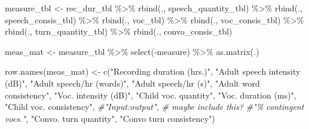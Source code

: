 \documentclass[
]{article}
\newenvironment{Shaded}{\begin{snugshade}}{\end{snugshade}}
\newcommand{\CommentTok}[1]{\textcolor[rgb]{0.56,0.35,0.01}{\textit{#1}}}
\newcommand{\FunctionTok}[1]{\textcolor[rgb]{0.00,0.00,0.00}{#1}}
\newcommand{\NormalTok}[1]{#1}
\newcommand{\OtherTok}[1]{\textcolor[rgb]{0.56,0.35,0.01}{#1}}
\newcommand{\SpecialCharTok}[1]{\textcolor[rgb]{0.00,0.00,0.00}{#1}}
\newcommand{\StringTok}[1]{\textcolor[rgb]{0.31,0.60,0.02}{#1}}
\begin{document}
\begin{Shaded}
\begin{Highlighting}[]
\NormalTok{measure\_tbl }\OtherTok{\textless{}{-}}\NormalTok{ rec\_dur\_tbl }\SpecialCharTok{\%\textgreater{}\%}
  \FunctionTok{rbind}\NormalTok{(., speech\_quantity\_tbl) }\SpecialCharTok{\%\textgreater{}\%}
  \FunctionTok{rbind}\NormalTok{(., speech\_consis\_tbl) }\SpecialCharTok{\%\textgreater{}\%}
  \FunctionTok{rbind}\NormalTok{(., voc\_tbl) }\SpecialCharTok{\%\textgreater{}\%}
  \FunctionTok{rbind}\NormalTok{(., voc\_consis\_tbl) }\SpecialCharTok{\%\textgreater{}\%}
  \FunctionTok{rbind}\NormalTok{(., turn\_quantity\_tbl) }\SpecialCharTok{\%\textgreater{}\%}
  \FunctionTok{rbind}\NormalTok{(., convo\_consis\_tbl) }
  
\NormalTok{meas\_mat }\OtherTok{\textless{}{-}}\NormalTok{ measure\_tbl }\SpecialCharTok{\%\textgreater{}\%} \FunctionTok{select}\NormalTok{(}\SpecialCharTok{{-}}\NormalTok{measure) }\SpecialCharTok{\%\textgreater{}\%} \FunctionTok{as.matrix}\NormalTok{(.)}

\FunctionTok{row.names}\NormalTok{(meas\_mat) }\OtherTok{\textless{}{-}} \FunctionTok{c}\NormalTok{(}\StringTok{"Recording duration (hrs.)"}\NormalTok{,}
                           \StringTok{"Adult speech intensity (dB)"}\NormalTok{,}
                           \StringTok{"Adult speech/hr (words)"}\NormalTok{,}
                           \StringTok{"Adult speech/hr (s)"}\NormalTok{,}
                           \StringTok{"Adult word consistency"}\NormalTok{,}
                           \StringTok{"Voc. intensity (dB)"}\NormalTok{,}
                           \StringTok{"Child voc. quantity"}\NormalTok{,}
                           \StringTok{"Voc. duration (ms)"}\NormalTok{,}
                           \StringTok{"Child voc. consistency"}\NormalTok{,}
                           \CommentTok{\#"Input:output", \# maybe include this?}
                           \CommentTok{\#"\% contingent vocs.",}
                           \StringTok{"Convo. turn quantity"}\NormalTok{,}
                           \StringTok{"Convo turn consistency"}\NormalTok{)}



\end{Highlighting}
\end{Shaded}
\end{document}
